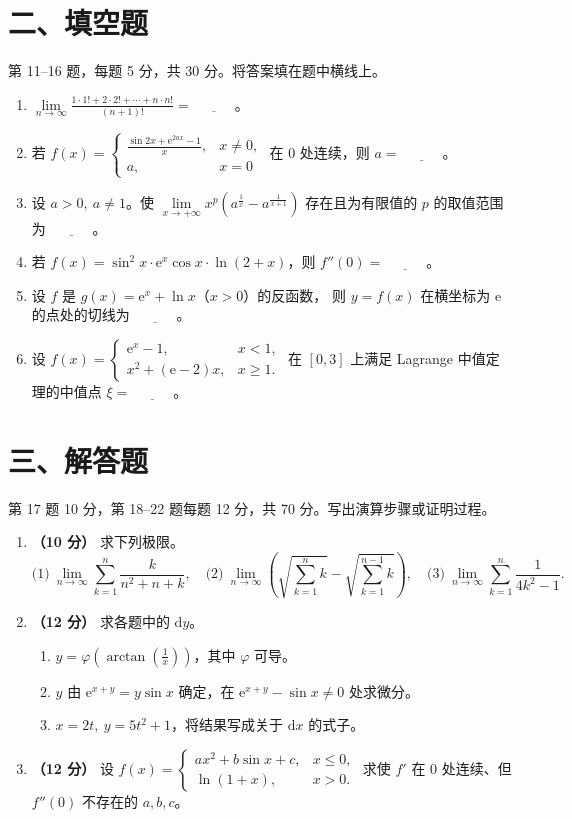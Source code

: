 \documentclass[UTF8,a4paper,zihao=-4,fontset=fandol]{ctexart}
\renewcommand{\lim}{\operatorname*{lim}\limits}
\newcommand{\blank}{\underline{\hspace{3em}}}
\newcommand{\fillsection}{%
  \section*{二、填空题}
  第 11--16 题，每题 5 分，共 30 分。将答案填在题中横线上。}
\newcommand{\solvesection}{%
  \newpage
  \section*{三、解答题}
  第 17 题 10 分，第 18--22 题每题 12 分，共 70 分。写出演算步骤或证明过程。}
\begin{document}
\fillsection
\begin{enumerate}[start=11]
\item $\displaystyle\lim_{n\to\infty}\frac{1\cdot1!+2\cdot2!+\cdots+n\cdot n!}{(n+1)!}=\blank$。
\item 若 $f(x)=\begin{cases}\frac{\sin 2x+\mathrm{e}^{2ax}-1}{x},&x\ne0,\\a,&x=0\end{cases}$
在 $0$ 处连续，则 $a=\blank$。
\item 设 $a>0,\ a\ne1$。使 $\displaystyle\lim_{x\to+\infty}x^p(a^{\frac{1}{x}}-a^{\frac{1}{x+1}})$
存在且为有限值的 $p$ 的取值范围为 $\blank$。
\item 若 $f(x)=\sin^2x\cdot\mathrm{e}^x\cos x\cdot\ln(2+x)$，则 $f''(0)=\blank$。
\item 设 $f$ 是 $g(x)=\mathrm{e}^x+\ln x$（$x>0$）的反函数，
则 $y=f(x)$ 在横坐标为 $\mathrm{e}$ 的点处的切线为 $\blank$。
\item 设 $f(x)=\begin{cases}\mathrm{e}^x-1,&x<1,\\x^2+(\mathrm{e}-2)x,&x\ge1.\end{cases}$
在 $[0,3]$ 上满足 Lagrange 中值定理的中值点 $\xi=\blank$。
\end{enumerate}
\solvesection
\begin{enumerate}[start=17]
\item \textbf{（10 分）} 求下列极限。
\[
 \text{(1)}\ \lim_{n\to\infty}\sum_{k=1}^n\frac{k}{n^2+n+k},
 \quad
 \text{(2)}\ \lim_{n\to\infty}
 \left(\sqrt{\sum_{k=1}^n k}-\sqrt{\sum_{k=1}^{n-1}k}\right),
 \quad
 \text{(3)}\ \lim_{n\to\infty}\sum_{k=1}^n\frac{1}{4k^2-1}.
\]
\vspace{4.5cm}
\item \textbf{（12 分）} 求各题中的 $\mathrm{d}y$。
\begin{enumerate}[label=(\arabic*),nosep]
\item $y=\varphi(\arctan(\frac{1}{x}))$，其中 $\varphi$ 可导。
\item $y$ 由 $\mathrm{e}^{x+y}=y\sin x$ 确定，在 $\mathrm{e}^{x+y}-\sin x\ne0$ 处求微分。
\item $x=2t,\ y=5t^2+1$，将结果写成关于 $\mathrm{d}x$ 的式子。
\end{enumerate}
\vspace{4.5cm}
\item \textbf{（12 分）} 设 $f(x)=\begin{cases}ax^2+b\sin x+c,&x\le0,\\\ln(1+x),&x>0.\end{cases}$
求使 $f'$ 在 $0$ 处连续、但 $f''(0)$ 不存在的 $a,b,c$。
\end{enumerate}
\end{document}
